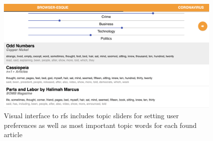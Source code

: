 \begin{figure}[!tb]
  \centering
  \includegraphics[width=1.0\linewidth]{recsys-intrs-workshop-2020/fig/screen_shots/screen_shot_10.png}
  \caption{Visual interface to \acrlong{rfs} includes topic sliders for setting user preferences as well as most important topic words for each found article}
  \label{fig:screen-shot}
\end{figure}